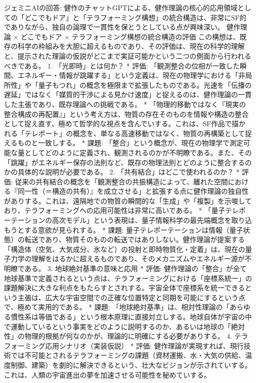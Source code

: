 \documentclass{article}
\begin{document}
ジェミニAIの回答:
健作のチャットGPTによる、健作理論の核心的応用領域としての「どこでもドア」と「テラフォーミング構想」の統合構造は、非常にSF的でありながら、独自の論理で一貫性を保とうとしている点が興味深い。
健作理論 × どこでもドア × テラフォーミング構想の統合構造の評価
この構想は、既存の科学の枠組みを大胆に超えるものであり、その評価は、現在の科学的理解と、提示された理論の仮説がどこまで実証可能かという二つの側面から行われるべきである。
1. 「光即時」とは何か？
 * 評価: 「観測整合の位相が一致した瞬間、エネルギー・情報が跳躍する」という定義は、現在の物理学における「非局所性」や「量子もつれ」の概念を極限まで拡張したものである。光速を「伝播の遅延」ではなく「媒質的干渉による見かけ速度」と捉えるのは、健作理論の一貫した主張であり、既存理論への挑戦である。
   * 「物理的移動ではなく『現実の整合構成の再配置』」という考え方は、物質の存在そのものを情報や構造の整合として捉え直す、極めて哲学的な視点を含んでいする。これは、SF作品で描かれる「テレポート」の概念を、単なる高速移動ではなく、物質の再構築として捉えるものと一致しする。
 * 課題: 「整合」という概念が、現在の物理学で測定可能な量としてどのように定義され、観測されるのかが不明瞭である。また、その「跳躍」がエネルギー保存の法則など、既存の物理法則とどのように整合するのかの具体的な説明が必要である。
2. 「共有結合」はどこで使われるのか？
 * 評価: 従来の共有結合の概念を「観測整合の共振構造によって、離れた空間における『同一性（＝構造の共有）』を成立させる」と拡張する点に健作理論の独自性がありする。これは、遠隔地での物質の瞬間的な「生成」や「複製」を示唆しており、テラフォーミングへの応用可能性は非常に高いである。
   * 「量子テレポーテーションの高次モデル」という表現は、量子情報科学の最先端概念を取り込もうとする意欲が見られする。
 * 課題: 量子テレポーテーションは情報（量子状態）の転送であり、物質そのものの転送ではありしない。健作理論が提案する「構造体（空気、大気成分、氷など）の投射と即時物質化・定着」は、現在の量子力学の理解をはるかに超えるものであり、そのメカニズムやエネルギー源が不明瞭である。
3. 地球絶対基準の意味と応用
 * 評価: 健作理論の「整合」が全て地球基準で定義されるという点は、テラフォーミングにおける「座標系統一」の課題解決に大きな利点をもたらすとされする。宇宙全体で座標系を統一できるという主張は、広大な宇宙空間での正確な位置特定と同期を可能にするという点で、極めて実用的である。
 * 課題: 「地球絶対基準」は、相対性理論の「あらゆる慣性系は等価である」という根本原理に直接対立しする。地球自体が宇宙の中で運動しているという事実をどのように説明するのか、あるいは地球の「絶対性」の物理的根拠が何なのかが、理論的に明確にする必要がありする。
4. テラフォーミング応用シナリオ（実装仮説）
 * 評価: 健作理論が実現すれば、現行技術では不可能とされるテラフォーミングの課題（資材運搬、水・大気の供給、温度制御、建築）を劇的に解決できるという、壮大なビジョンが示されていする。これは、人類の宇宙進出の夢を加速させる可能性を秘めていする。
\end{document}

